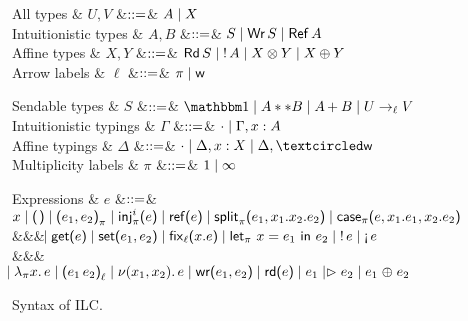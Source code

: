 \begin{figure*}[t]
  \centering
  \begin{minipage}{.475\textwidth}
    \centering
    \begin{grammar}
        All types
      & $U, V$
        &$\mathrel{::=}$& $A \mathrel{\mid} X$
      \\      
      Intuitionistic types
      & $A,B$
      &$\mathrel{::=}$& $S \mathrel{\mid} \text{\textsf{Wr}}\,S \mathrel{\mid} \text{\textsf{Ref}}\,A$
      \\
      Affine types
      & $X,Y$
      &$\mathrel{::=}$& $\text{\textsf{Rd}}\,S \mathrel{\mid} {!}\,{A} \mathrel{\mid}
      {X}\otimes{Y} \mathrel{\mid} {X}\oplus{Y}$
      \\
      Arrow labels
      & $\ell$
      &$\mathrel{::=}$& $\pi \mathrel{\mid} \textsf{w}$
    \end{grammar}
  \end{minipage}%
  \begin{minipage}{.475\textwidth}
    \centering
    \begin{grammar}
      Sendable types
      & $S$
      &$\mathrel{::=}$& $\tyUnit \bnfalt A ** B \bnfalt \tySum{A}{}{B} \bnfalt \tyArr{U}{\ell}{V}$              
      \\
      Intuitionistic typings
      & $\Gamma$
      &$\mathrel{::=}$& $\cdot \mathrel{\mid} \Gamma,x:A$
      \\
      Affine typings
      & $\Delta$
      &$\mathrel{::=}$& $\emptyctxt \bnfalt \Delta,x:X \bnfalt \Delta, \wrtok$
      \\            
      Multiplicity labels
      & $\pi$
      &$\mathrel{::=}$& $1 \mathrel{\mid} \infty$
    \end{grammar}
  \end{minipage}
  \begin{grammar}
    Expressions
    & $e$
    &$\mathrel{::=}$&
    $\eVar{x} \bnfalt \eUnit \bnfalt \ePair{e_1}{e_2}{\pi} \bnfalt \eInj{i}{e}
    \bnfalt \eRef{e} \bnfalt \eSplit{e_1}{x_1}{x_2}{e_2} \bnfalt
    \eCase{\pi}{e}{x_1}{e_1}{x_2}{e_2}$
    \\ &&& $\hspace{-1.02ex}\mathrel{\mid} \text{\textsf{get}}\textsf{(}{e}\textsf{)} \mathrel{\mid} \text{\textsf{set}}\textsf{(}{e_1},{e_2}\textsf{)} \mathrel{\mid} \text{\textsf{fix}}_{\ell}\textsf{(}{x}.{e}\textsf{)}
    \mathrel{\mid} \text{\textsf{let}}_{\pi}\ {x} = {e_1}\ \text{\textsf{in}}\ {e_2} \mathrel{\mid} {!}\,{e} \mathrel{\mid} \textnormal{!`}\,{e}$
    \\ &&& $\hspace{-1.02ex}\mathrel{\mid} \lambda_{\pi} {x}.\,{e} \mathrel{\mid} \textsf{(} e_1\,e_2\textsf{)}_{\ell}
    \mathrel{\mid} \nu(x_1,x_2).\,e \mathrel{\mid} \text{\textsf{wr}}\textsf{(}{e_1},{e_2}\textsf{)}
    \mathrel{\mid} \text{\textsf{rd}}\textsf{(}{e}\textsf{)} \mathrel{\mid} e_1 \mathrel{|\rhd} e_2 \mathrel{\mid} e_1 \mathrel{\oplus} e_2$
  \end{grammar}      
  \caption{Syntax of ILC.}
  \label{fig:ilc-syntax}
\end{figure*}
